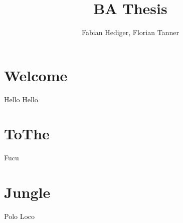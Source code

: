 %
%




% 
% 



\title{BA Thesis}
\author{Fabian Hediger, Florian Tanner}



  

  \section{Welcome}
  Hello Hello \cite{IEEEexample:article_typical}

  \section{ToThe}
  Fucu \cite{mirrorcle_userguide}

  \section{Jungle}
  Polo Loco \cite{microchip_spi} \cite{verryUseFulArticle}

  
  


